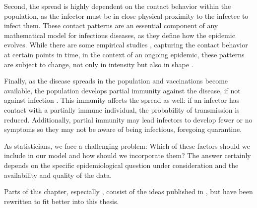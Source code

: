 Second, the spread is highly dependent on the contact behavior within the population, as the infector must be in close physical proximity to the infectee to infect them. These contact patterns are an essential component of any mathematical model for infectious diseases, as they define how the epidemic evolves. While there are some empirical studies \citep{Tomori2021Individual,Mossong2008Social}, capturing the contact behavior at certain points in time, in the context of an ongoing epidemic, these patterns are subject to change, not only in intensity but also in shape \citep{Tomori2021Individual}. %

Finally, as the disease spreads in the population and vaccinations become available, the population develops partial immunity against the disease, if not against infection \citep{Wu2023Longterm}. This immunity affects the spread as well: if an infector has contact with a partially immune individual, the probability of transmission is reduced. Additionally, partial immunity may lead infectors to develop fewer or no symptoms so they may not be aware of being infectious, foregoing quarantine.

As statisticians, we face a challenging problem: Which of these factors should we include in our model and how should we incorporate them? The answer certainly depends on the specific epidemiological question under consideration and the availability and quality of the data. 

Parts of this chapter, especially , consist of the ideas published in \citep{Heyder2023Measures}, but have been rewritten to fit better into this thesis.





